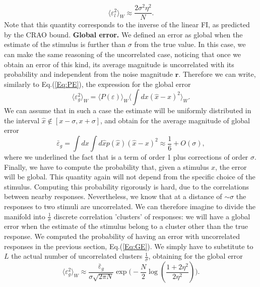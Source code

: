 \documentclass[a4paper]{article}
\begin{document}
\begin{equation}
\langle \varepsilon_l^2\rangle_W  \approx \frac{2\sigma^2\eta^2}{N}.
\end{equation}
Note that this quantity corresponds to the inverse of the linear FI, as predicted by the CRAO bound.
\newline
\newline
\textbf{Global error.} We defined an error as global when the estimate of the stimulus is further than $\sigma$ from the true value. In this case, we can make the same reasoning of the uncorrelated case, noticing that once we obtain an error of this kind, its average magnitude is uncorrelated with its probability and independent from the noise magnitude $\mathbf{r}$. Therefore we can write, similarly to Eq.(\ref{Eq:PE}), the expression for the global error
\begin{equation}
\langle \varepsilon^2_g\rangle_W = \langle P(\varepsilon)\rangle_W \langle \int dx (\hat{x}-x)^2\rangle_W.
\end{equation}We can assume that in such a case the estimate will be uniformly distributed in the interval $\hat{x} \not \in [x-\sigma,x+\sigma]$, and obtain for the average magnitude of global error
\begin{equation}
\bar{\varepsilon}_g = \int dx \int d \hat{x} p(\hat{x}) (\hat{x}-x)^2 \approx \frac{1}{6} + O(\sigma),
\end{equation}where we underlined the fact that is a term of order 1 plus corrections of order $\sigma$.
Finally, we have to compute the probability that, given a stimulus $x$, the error will be global. This quantity again will not depend from the specific choice of the stimulus. Computing this probability rigorously is hard, due to the correlations between nearby responses. Nevertheless, we know that at a distance of $\sim \sigma$ the responses to two stimuli are uncorrelated. We can therefore imagine to divide the manifold into $\frac{1}{\sigma}$ discrete correlation 'clusters' of responses: we will have a global error when the estimate of the stimulus belong to a cluster other than the true response. We computed the probability of having an error with uncorrelated responses in the previous section, Eq.(\ref{Eq:GE}). We simply have to substitute to $L$ the actual number of uncorrelated clusters $\frac{1}{\sigma}$, obtaining for the global error
\begin{equation}
 \langle \varepsilon_g^2\rangle_W \approx \frac{\bar{\varepsilon}_g}{\sigma\sqrt{2\pi N}} \exp{\Big(-\frac{N}{2} \log(\frac{1+2\eta^2}{2\eta^2})\Big)}.
\end{equation}
\end{document}

